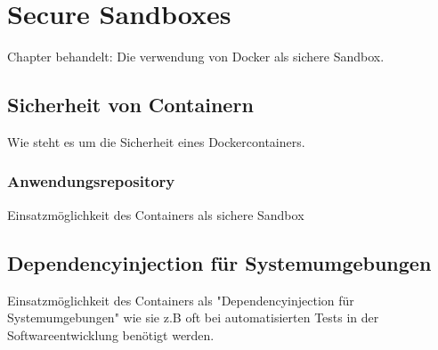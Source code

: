 \chapter{Secure Sandboxes}
\label{sec:secure_sandboxes}
Chapter behandelt: Die verwendung von Docker als sichere Sandbox.
\section{Sicherheit von Containern}
\label{sec:sicherheit_von_containern}
Wie steht es um die Sicherheit eines Dockercontainers.

\subsection{Anwendungsrepository}
\label{subsec:anwendungsrepository}
Einsatzmöglichkeit des Containers als sichere Sandbox

\section{Dependencyinjection für Systemumgebungen}
\label{sec:sicherheit_von_containern}
Einsatzmöglichkeit des Containers als "Dependencyinjection für Systemumgebungen" wie sie z.B oft bei automatisierten Tests in der Softwareentwicklung benötigt werden.